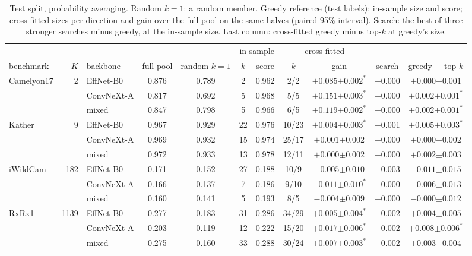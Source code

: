 \begin{table}[t]
\centering
\footnotesize
\caption{Test split, probability averaging. Random $k{=}1$: a random member. Greedy reference (test labels): in-sample size and score; cross-fitted sizes per direction and gain over the full pool on the same halves (paired 95\% interval). Search: the best of three stronger searches minus greedy, at the in-sample size. Last column: cross-fitted greedy minus top-$k$ at greedy's size.}
\label{tab:size}
\setlength{\tabcolsep}{3pt}\begin{adjustbox}{max width=\linewidth}
\begin{tabular}{lrlcccccccc}
\toprule
& & & & & \multicolumn{2}{c}{in-sample} & \multicolumn{2}{c}{cross-fitted} & & \\ \cmidrule(lr){6-7}\cmidrule(lr){8-9} benchmark & $K$ & backbone & full pool & random $k{=}1$ & $k$ & score & $k$ & gain & search & greedy $-$ top-$k$ \\
\midrule
Camelyon17 & 2 & EffNet-B0 & 0.876 & 0.789 & 2 & 0.962 & 2/2 & $+0.085{\scriptstyle\pm0.002}^{\ast}$ & +0.000 & $+0.000{\scriptstyle\pm0.001}$ \\
 &  & ConvNeXt-A & 0.817 & 0.692 & 5 & 0.968 & 5/5 & $+0.151{\scriptstyle\pm0.003}^{\ast}$ & +0.000 & $+0.002{\scriptstyle\pm0.001}^{\ast}$ \\
 &  & mixed & 0.847 & 0.798 & 5 & 0.966 & 6/5 & $+0.119{\scriptstyle\pm0.002}^{\ast}$ & +0.000 & $+0.002{\scriptstyle\pm0.001}^{\ast}$ \\
\addlinespace
Kather & 9 & EffNet-B0 & 0.967 & 0.929 & 22 & 0.976 & 10/23 & $+0.004{\scriptstyle\pm0.003}^{\ast}$ & +0.001 & $+0.005{\scriptstyle\pm0.003}^{\ast}$ \\
 &  & ConvNeXt-A & 0.969 & 0.932 & 15 & 0.974 & 25/17 & $+0.001{\scriptstyle\pm0.002}$ & +0.000 & $+0.000{\scriptstyle\pm0.002}$ \\
 &  & mixed & 0.972 & 0.933 & 13 & 0.978 & 12/11 & $+0.000{\scriptstyle\pm0.002}$ & +0.000 & $+0.002{\scriptstyle\pm0.003}$ \\
\addlinespace
iWildCam & 182 & EffNet-B0 & 0.171 & 0.152 & 27 & 0.188 & 10/9 & $-0.005{\scriptstyle\pm0.010}$ & +0.003 & $-0.011{\scriptstyle\pm0.015}$ \\
 &  & ConvNeXt-A & 0.166 & 0.137 & 7 & 0.186 & 9/10 & $-0.011{\scriptstyle\pm0.010}^{\ast}$ & +0.000 & $-0.006{\scriptstyle\pm0.013}$ \\
 &  & mixed & 0.160 & 0.141 & 5 & 0.193 & 8/5 & $-0.004{\scriptstyle\pm0.009}$ & +0.000 & $-0.000{\scriptstyle\pm0.012}$ \\
\addlinespace
RxRx1 & 1139 & EffNet-B0 & 0.277 & 0.183 & 31 & 0.286 & 34/29 & $+0.005{\scriptstyle\pm0.004}^{\ast}$ & +0.002 & $+0.004{\scriptstyle\pm0.005}$ \\
 &  & ConvNeXt-A & 0.203 & 0.119 & 12 & 0.222 & 15/20 & $+0.017{\scriptstyle\pm0.006}^{\ast}$ & +0.002 & $+0.008{\scriptstyle\pm0.006}^{\ast}$ \\
 &  & mixed & 0.275 & 0.160 & 33 & 0.288 & 30/24 & $+0.007{\scriptstyle\pm0.003}^{\ast}$ & +0.002 & $+0.003{\scriptstyle\pm0.004}$ \\
\bottomrule
\end{tabular}
\end{adjustbox}
\end{table}

